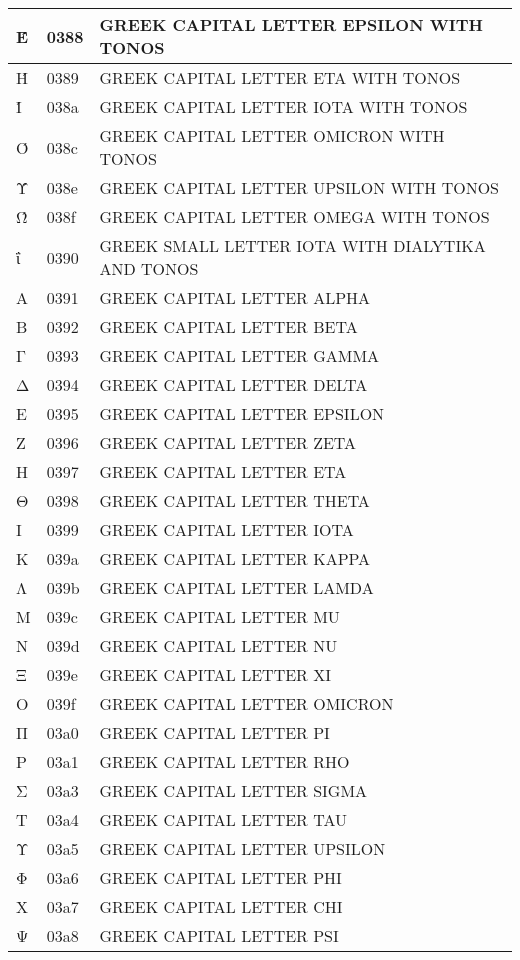 \documentclass[12pt,letterpaper,openany]{book}
\begin{document}
\begin{center}
\begin{supertabular}{|m{0.25in}|m{0.5in}|m{4in}|}
Έ & 0388 & GREEK CAPITAL LETTER EPSILON WITH TONOS\\\hline
Ή & 0389 & GREEK CAPITAL LETTER ETA WITH TONOS\\\hline
Ί & 038a & GREEK CAPITAL LETTER IOTA WITH TONOS\\\hline
Ό & 038c & GREEK CAPITAL LETTER OMICRON WITH TONOS\\\hline
Ύ & 038e & GREEK CAPITAL LETTER UPSILON WITH TONOS\\\hline
Ώ & 038f & GREEK CAPITAL LETTER OMEGA WITH TONOS\\\hline
ΐ & 0390 & GREEK SMALL LETTER IOTA WITH DIALYTIKA AND TONOS\\\hline
Α & 0391 & GREEK CAPITAL LETTER ALPHA\\\hline
Β & 0392 & GREEK CAPITAL LETTER BETA\\\hline
Γ & 0393 & GREEK CAPITAL LETTER GAMMA\\\hline
Δ & 0394 & GREEK CAPITAL LETTER DELTA\\\hline
Ε & 0395 & GREEK CAPITAL LETTER EPSILON\\\hline
Ζ & 0396 & GREEK CAPITAL LETTER ZETA\\\hline
Η & 0397 & GREEK CAPITAL LETTER ETA\\\hline
Θ & 0398 & GREEK CAPITAL LETTER THETA\\\hline
Ι & 0399 & GREEK CAPITAL LETTER IOTA\\\hline
Κ & 039a & GREEK CAPITAL LETTER KAPPA\\\hline
Λ & 039b & GREEK CAPITAL LETTER LAMDA\\\hline
Μ & 039c & GREEK CAPITAL LETTER MU\\\hline
Ν & 039d & GREEK CAPITAL LETTER NU\\\hline
Ξ & 039e & GREEK CAPITAL LETTER XI\\\hline
Ο & 039f & GREEK CAPITAL LETTER OMICRON\\\hline
Π & 03a0 & GREEK CAPITAL LETTER PI\\\hline
Ρ & 03a1 & GREEK CAPITAL LETTER RHO\\\hline
Σ & 03a3 & GREEK CAPITAL LETTER SIGMA\\\hline
Τ & 03a4 & GREEK CAPITAL LETTER TAU\\\hline
Υ & 03a5 & GREEK CAPITAL LETTER UPSILON\\\hline
Φ & 03a6 & GREEK CAPITAL LETTER PHI\\\hline
Χ & 03a7 & GREEK CAPITAL LETTER CHI\\\hline
Ψ & 03a8 & GREEK CAPITAL LETTER PSI\\\hline

\end{supertabular}
\end{center}
\end{document}
